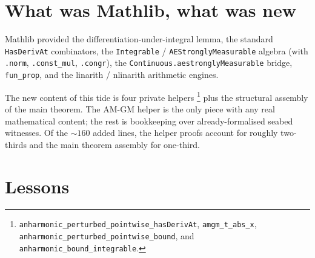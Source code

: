\documentclass[11pt]{article}
\begin{document}
\section{What was Mathlib, what was new}

Mathlib provided the differentiation-under-integral lemma, the
standard \texttt{HasDerivAt} combinators, the
\texttt{Integrable} / \texttt{AEStronglyMeasurable} algebra (with
\texttt{.norm}, \texttt{.const\_mul}, \texttt{.congr}), the
\texttt{Continuous.aestronglyMeasurable} bridge, \texttt{fun\_prop},
and the linarith / nlinarith arithmetic engines.

The new content of this tide is four private helpers%
\footnote{\texttt{anharmonic\_perturbed\_pointwise\_hasDerivAt},
\texttt{amgm\_t\_abs\_x},
\texttt{anharmonic\_perturbed\_pointwise\_bound}, and
\texttt{anharmonic\_bound\_integrable}.}
plus the structural assembly of the main theorem. The AM-GM helper is
the only piece with any real mathematical content; the rest is
bookkeeping over already-formalised seabed witnesses. Of the
\(\sim 160\) added lines, the helper proofs account for roughly
two-thirds and the main theorem assembly for one-third.

\section{Lessons}
\end{document}
